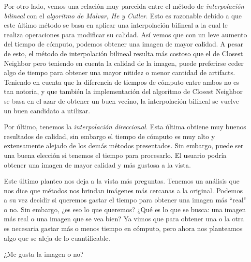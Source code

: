 \begin{itemize}
\vspace{\baselineskip}

Por otro lado, vemos una relación muy parecida entre el método de \textit{interpolación bilineal} con el \textit{algoritmo de Malvar, He y Cutler}. Esto es razonable debido a que este último método se basa en aplicar una interpolación bilineal a la cual le realiza operaciones para modificar su calidad. Así vemos que con un leve aumento del tiempo de cómputo, podemos obtener una imagen de mayor calidad. A pesar de esto, el método de interpolación bilineal resulta más costoso que el de Closest Neighbor pero teniendo en cuenta la calidad de la imagen, puede preferirse ceder algo de tiempo para obtener una mayor nitidez o menor cantidad de artifacts. Teniendo en cuenta que la diferencia de tiempos de cómputo entre ambos no es tan notoria, y que también la implementación del algoritmo de Closest Neighbor se basa en el azar de obtener un buen vecino, la interpolación bilineal se vuelve un buen candidato a utilizar.

\vspace{\baselineskip}

Por último, tenemos la \textit{interpolación direccional}. Esta última obtiene muy buenos resultados de calidad, sin embargo el tiempo de cómputo es muy alto y extensamente alejado de los demás métodos presentados.
Sin embargo, puede ser una buena elección si tenemos el tiempo para procesarlo. El usuario podría obtener una imagen de mayor calidad y más gustosa a la vista. 

\vspace{\baselineskip}

Este último planteo nos deja a la vista más preguntas. Tenemos un análisis que nos dice que métodos nos brindan imágenes más cercanas a la original. Podemos a su vez decidir si queremos gastar el tiempo para obtener una imagen más ``real'' o no. Sin embargo, ¿es eso lo que queremos? ¿Qué es lo que se busca: una imagen más real o una imagen que se vea bien? Ya vimos que para obtener una o la otra es necesaria gastar más o menos tiempo en cómputo, pero ahora nos planteamos algo que se aleja de lo cuantificable. 

\vspace{\baselineskip}

¿Me gusta la imagen o no? 




\end{itemize}

\newpage


